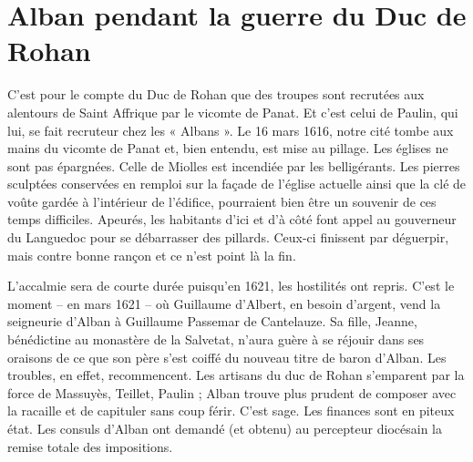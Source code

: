 \section*{Alban pendant la guerre du Duc de Rohan}

C'est pour le compte du Duc de Rohan que des troupes sont recrutées
aux alentours de Saint Affrique par le vicomte de Panat. Et c'est celui
de Paulin, qui lui, se fait recruteur chez les « Albans ». Le 16 mars
1616, notre cité tombe aux mains du vicomte de Panat et, bien entendu,
est mise au pillage. Les églises ne sont pas épargnées. Celle de Miolles
est incendiée par les belligérants. Les pierres sculptées conservées en
remploi sur la façade de l'église actuelle ainsi que la clé de voûte
gardée à l'intérieur de l'édifice, pourraient bien être un souvenir de
ces temps difficiles. Apeurés, les habitants d'ici et d'à côté font
appel au gouverneur du Languedoc pour se débarrasser des pillards.
Ceux-ci finissent par déguerpir, mais contre bonne rançon et ce n'est
point là la fin.

L'accalmie sera de courte durée puisqu'en 1621, les hostilités ont
repris. C'est le moment -- en mars 1621 -- où Guillaume d'Albert, en
besoin d'argent, vend la seigneurie d'Alban à Guillaume Passemar de
Cantelauze. Sa fille, Jeanne, bénédictine au monastère de la Salvetat,
n'aura guère à se réjouir dans ses oraisons de ce que son père s'est
coiffé du nouveau titre de baron d'Alban. Les troubles, en effet,
recommencent. Les artisans du duc de Rohan s'emparent par la force de
Massuyès, Teillet, Paulin ; Alban trouve plus prudent de composer avec
la racaille et de capituler sans coup férir. C'est sage. Les finances
sont en piteux état. Les consuls d'Alban ont demandé (et obtenu) au
percepteur diocésain la remise totale des impositions.